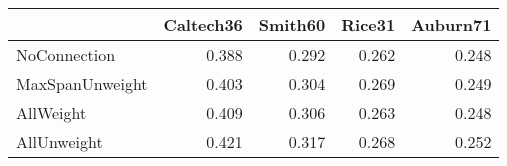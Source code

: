 \begin{tabular}{lrrrr}
\toprule
{} & Caltech36 & Smith60 & Rice31 & Auburn71 \\
\midrule
NoConnection    &     0.388 &   0.292 &  0.262 &    0.248 \\
MaxSpanUnweight &     0.403 &   0.304 &  0.269 &    0.249 \\
AllWeight       &     0.409 &   0.306 &  0.263 &    0.248 \\
AllUnweight     &     0.421 &   0.317 &  0.268 &    0.252 \\
\bottomrule
\end{tabular}
